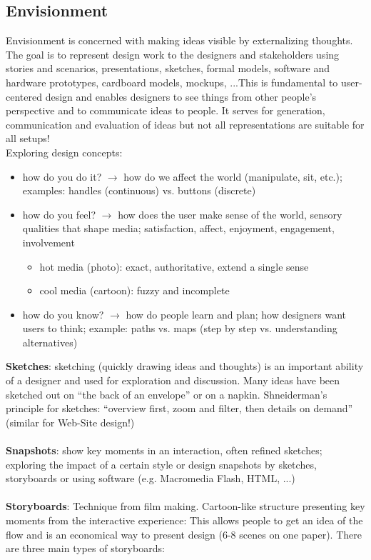 \subsection{Envisionment}
Envisionment is concerned with making ideas visible by externalizing thoughts. The goal is to represent design work to the designers and stakeholders using stories and scenarios, presentations, sketches, formal models, software and hardware prototypes, cardboard models, mockups, ...This is fundamental to user-centered design and enables designers to see things from other people's perspective and to communicate ideas to people. It serves for generation, communication and evaluation of ideas but not all representations are suitable for all setups!\\
Exploring design concepts:
\begin{itemize}
\item how do you do it? $\rightarrow$ how do we affect the world (manipulate, sit, etc.); examples: handles (continuous) vs. buttons (discrete)
\item how do you feel? $\rightarrow$ how does the user make sense of the world, sensory qualities that shape media; satisfaction, affect, enjoyment, engagement, involvement
\begin{itemize}
\item hot media (photo): exact, authoritative, extend a single sense
\item cool media (cartoon): fuzzy and incomplete
\end{itemize}
\item how do you know? $\rightarrow$ how do people learn and plan; how designers want users to think; example: paths vs. maps (step by step vs. understanding alternatives)
\end{itemize}
\textbf{Sketches}: sketching (quickly drawing ideas and thoughts) is an important ability of a designer and used for exploration and discussion. Many ideas have been sketched out on ``the back of an envelope'' or on a napkin. Shneiderman's principle for sketches: ``overview first, zoom and filter, then details on demand'' (similar for Web-Site design!)\\\\
\textbf{Snapshots}: show key moments in an interaction, often refined sketches; exploring the impact of a certain style or design snapshots by sketches, storyboards or using software (e.g. Macromedia Flash, HTML, ...)\\\\
\textbf{Storyboards}: Technique from film making. Cartoon-like structure presenting key moments from the interactive experience: This allows people to get an idea of the flow and is an economical way to present design (6-8 scenes on one paper). There are three main types of storyboards:
